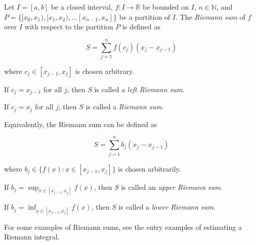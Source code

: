 \documentclass{article}
\begin{document}
Let $I=[a,b]$ be a closed interval, $f: I \rightarrow \mathbb{R}$ be bounded on $I$, $n \in \mathbb{N}$, and $P = \{[x_0, x_1), [x_1, x_2), \dots [x_{n-1}, x_n]\}$ be a partition of $I$.  The \emph{Riemann sum} of $f$ over $I$ with respect to the partition $P$ is defined as

$$S=\sum_{j=1}^n f(c_j)(x_j-x_{j-1})$$

where $c_j \in [x_{j-1},x_j]$ is chosen arbitrary.

If $c_j=x_{j-1}$ for all $j$, then $S$ is called a \emph{left Riemann sum}.

If $c_j=x_j$ for all $j$, then $S$ is called a \emph{ Riemann sum}.

Equivalently, the Riemann sum can be defined as

$$S=\sum_{j=1}^n b_j(x_j-x_{j-1})$$

where $b_j \in \{ f(x):x\in[x_{j-1},x_j]\}$ is chosen arbitrarily.

If $\displaystyle b_j=\sup_{x\in[x_{j-1},x_j]} f(x)$, then $S$ is called an \emph{upper Riemann sum}.

If $\displaystyle b_j=\inf_{x\in[x_{j-1},x_j]} f(x)$, then $S$ is called a \emph{lower Riemann sum}.

For some examples of Riemann sums, see the entry examples of estimating a Riemann integral.
\end{document}
